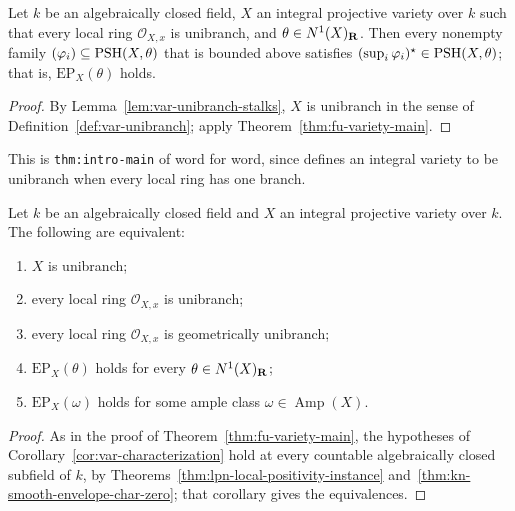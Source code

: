 \begin{theorem}
\label{thm:fu-variety-main-stalks}
\leanok
Let $k$ be an algebraically closed field, $X$ an integral projective variety over
$k$ such that every local ring $\mathcal O_{X,x}$ is unibranch, and
$\theta\in N^1(X)_{\mathbf{R}}$. Then every nonempty family
$(\varphi_i)\subseteq\operatorname{PSH}(X,\theta)$ that is bounded above satisfies
$(\sup_i\varphi_i)^\star\in\operatorname{PSH}(X,\theta)$; that is, $\mathrm{EP}_X(\theta)$
holds.
\end{theorem}
\begin{proof}
By Lemma~\ref{lem:var-unibranch-stalks}, $X$ is unibranch in the sense of
Definition~\ref{def:var-unibranch}; apply Theorem~\ref{thm:fu-variety-main}.
\end{proof}

This is \texttt{thm:intro-main} of \cite{FHX} word for word, since
\cite[\S1.1]{FHX} defines an integral variety to be unibranch when every local
ring has one branch.

\begin{corollary}
\label{cor:fu-variety-characterization}
\leanok
Let $k$ be an algebraically closed field and $X$ an integral projective variety
over $k$. The following are equivalent:
\begin{enumerate}
\item $X$ is unibranch;
\item[(1$'$)] every local ring $\mathcal O_{X,x}$ is unibranch;
\item[(1$''$)] every local ring $\mathcal O_{X,x}$ is geometrically unibranch;
\item[(2)] $\mathrm{EP}_X(\theta)$ holds for every $\theta\in N^1(X)_{\mathbf{R}}$;
\item[(3)] $\mathrm{EP}_X(\omega)$ holds for some ample class $\omega\in\operatorname{Amp}(X)$.
\end{enumerate}
\end{corollary}
\begin{proof}
As in the proof of Theorem~\ref{thm:fu-variety-main}, the hypotheses of
Corollary~\ref{cor:var-characterization} hold at every countable algebraically
closed subfield of $k$, by Theorems~\ref{thm:lpn-local-positivity-instance}
and~\ref{thm:kn-smooth-envelope-char-zero}; that corollary gives the
equivalences.
\end{proof}

